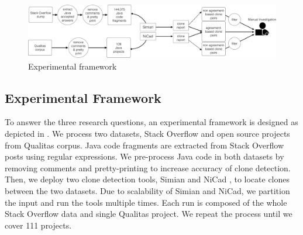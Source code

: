 \documentclass{sig-alternate-05-2015}
\begin{document}
\begin{figure}
	\centering
	\includegraphics[width=0.9\linewidth]{exp_framework}
	\caption{Experimental framework}
	\label{fig:exp_framework}
\end{figure}

\subsection{Experimental Framework}
To answer the three research questions, an experimental framework is designed as depicted in . We process two datasets, Stack Overflow and open source projects from Qualitas corpus. Java code fragments are extracted from Stack Overflow posts using regular expressions. We pre-process Java code in both datasets by removing comments and pretty-printing to increase accuracy of clone detection. Then, we deploy two clone detection tools, Simian \cite{simian} and NiCad \cite{Roy2008,Cordy}, to locate clones between the two datasets. Due to scalability of Simian and NiCad, we partition the input and run the tools multiple times. Each run is composed of the whole Stack Overflow data and single Qualitas project. We repeat the process until we cover 111 projects. 
\end{document}
